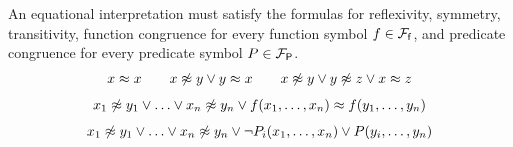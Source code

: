 \begin{example}
	An equational interpretation must satisfy the formulas for reflexivity, symmetry, transitivity, 
	function congruence for every function symbol $f\in{{\mathcal F}_{\mathsf f}}$, 
	and predicate congruence for every predicate symbol $P\in{{\mathcal F}_{\mathsf P}}$.
	\[
		\begin{array}[t]{c}
		x\mEQ x 
\qquad
		x\mNE y\lor y\mEQ x
\qquad		
		x\mNE y\lor y\mNE z\lor x\mEQ z \\[0.7em]
%		
x_1 \mNE y_1\lor\ldots\lor x_n \mNE y_n\lor f(x_1,\ldots,x_n)\mEQ f(y_1,\ldots,y_n) \\[0.7em]
%
x_1\mNE y_1\lor\ldots\lor x_n\mNE y_n\lor\lnot P_i(x_1,\ldots,x_n)\lor P(y_i,\ldots,y_n)

		\end{array}
	\]







\end{example}

